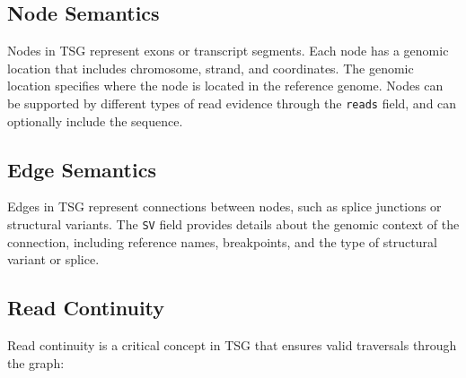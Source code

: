 \documentclass[11pt,a4paper]{article}
\begin{document}
\subsection{Node Semantics}

Nodes in TSG represent exons or transcript segments.
Each node has a genomic location that includes chromosome, strand, and coordinates.
The genomic location specifies where the node is located in the reference genome.
Nodes can be supported by different types of read evidence through the \texttt{reads} field, and can optionally include the sequence.

\subsection{Edge Semantics}

Edges in TSG represent connections between nodes, such as splice junctions or structural variants.
The \texttt{SV} field provides details about the genomic context of the connection, including reference names, breakpoints, and the type of structural variant or splice.

\subsection{Read Continuity}

Read continuity is a critical concept in TSG that ensures valid traversals through the graph:
\end{document}
